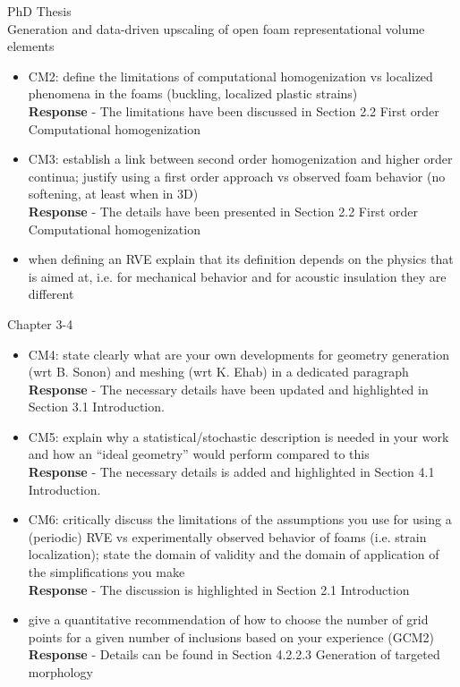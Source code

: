 \documentclass[12pt]{letter}
\begin{document}
\begin{letter}{PhD Thesis\\
Generation and data-driven upscaling of open foam representational volume elements}
\begin{itemize}
\item CM2: define the limitations of computational homogenization vs localized
phenomena in the foams (buckling, localized plastic strains)
\\\textbf{Response} - The limitations have been discussed in Section 2.2 First order Computational homogenization

\item CM3: establish a link between second order homogenization and higher order
continua; justify using a first order approach vs observed foam behavior (no
softening, at least when in 3D)
\\\textbf{Response} - The details have been presented in Section 2.2 First order Computational homogenization

\item when defining an RVE explain that its definition depends on the physics that is
aimed at, i.e. for mechanical behavior and for acoustic insulation they are different

\end{itemize}

Chapter 3-4

\begin{itemize}
	
\item CM4: state clearly what are your own developments for geometry generation (wrt B.
Sonon) and meshing (wrt K. Ehab) in a dedicated paragraph
\\\textbf{Response} - The necessary details have been updated and highlighted in Section 3.1 Introduction.

\item CM5: explain why a statistical/stochastic description is needed in your work and
how an “ideal geometry” would perform compared to this
\\\textbf{Response} - The necessary details is added and highlighted in Section 4.1 Introduction.

\item CM6: critically discuss the limitations of the assumptions you use for using a
(periodic) RVE vs experimentally observed behavior of foams (i.e. strain
localization); state the domain of validity and the domain of application of the
simplifications you make
\\\textbf{Response} - The discussion is highlighted in Section 2.1 Introduction

\item give a quantitative recommendation of how to choose the number of grid points for
a given number of inclusions based on your experience (GCM2)
\\\textbf{Response} - Details can be found in Section 4.2.2.3 Generation of targeted morphology


\end{itemize}
\end{letter}
\end{document}

